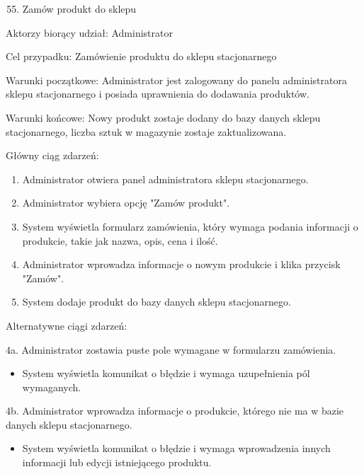 \documentclass[
]{article}
\providecommand{\tightlist}{%
  \setlength{\itemsep}{0pt}\setlength{\parskip}{0pt}}
\begin{document}
\begin{enumerate}
\setcounter{enumi}{54}
\tightlist
\item
  {Zamów produkt do sklepu}
\end{enumerate}

{Aktorzy biorący udział: Administrator}

{Cel przypadku: Zamówienie produktu do sklepu stacjonarnego}

{Warunki początkowe: Administrator jest zalogowany do panelu
administratora sklepu stacjonarnego i posiada uprawnienia do dodawania
produktów.}

{Warunki końcowe: Nowy produkt zostaje dodany do bazy danych sklepu
stacjonarnego, liczba sztuk w magazynie zostaje zaktualizowana.}

{Główny ciąg zdarzeń:}

\begin{enumerate}
\tightlist
\item
  {Administrator otwiera panel administratora sklepu stacjonarnego.}
\item
  {Administrator wybiera opcję "Zamów produkt".}
\item
  {System wyświetla formularz zamówienia, który wymaga podania
  informacji o produkcie, takie jak nazwa, opis, cena i ilość.}
\item
  {Administrator wprowadza informacje o nowym produkcie i klika przycisk
  "Zamów".}
\item
  {System dodaje produkt do bazy danych sklepu stacjonarnego.}
\end{enumerate}

{Alternatywne ciągi zdarzeń:}

{4a. Administrator zostawia puste pole wymagane w formularzu
zamówienia.}

\begin{itemize}
\tightlist
\item
  {System wyświetla komunikat o błędzie i wymaga uzupełnienia pól
  wymaganych.}
\end{itemize}

{4b. Administrator wprowadza informacje o produkcie, którego nie ma w
bazie danych sklepu stacjonarnego.}

\begin{itemize}
\tightlist
\item
  {System wyświetla komunikat o błędzie i wymaga wprowadzenia innych
  informacji lub edycji istniejącego produktu.}
\end{itemize}
\end{document}
